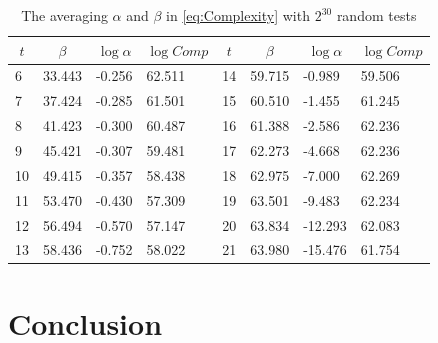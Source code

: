 \begin{table}[htbp]
  \centering
  \caption{The averaging $\alpha$ and $\beta$ in \eqref{eq:Complexity} with $2^{30}$ random tests}\label{tab:ZhangAlphaAndBetaOriginal}
    \begin{tabular}{|l|l|l|l|l|l|l|l|}
    \hline
    \multicolumn{1}{|c|}{$t$} & \multicolumn{1}{c|}{$\beta$} & \multicolumn{1}{c|}{$\log\alpha$} & \multicolumn{1}{c|}{$\log Comp$} & \multicolumn{1}{c|}{$t$} & \multicolumn{1}{c|}{$\beta$} & \multicolumn{1}{c|}{$\log\alpha$} & \multicolumn{1}{c|}{$\log Comp$} \\
    \hline

    6    & 33.443 & -0.256 & 62.511 & 14    & 59.715 & -0.989 &  59.506\\
    \hline
    7    & 37.424 & -0.285 & 61.501 & 15    & 60.510 & -1.455 &  61.245\\
    \hline
    8    & 41.423 & -0.300 & 60.487 & 16    & 61.388 & -2.586 &  62.236\\
    \hline
    9    & 45.421  & -0.307 & 59.481 & 17    & 62.273 & -4.668 &  62.236\\
    \hline
    10   & 49.415 & -0.357  & 58.438 & 18    & 62.975 & -7.000 &  62.269\\
    \hline
    11    & 53.470 & -0.430 & 57.309 & 19    & 63.501 & -9.483 &  62.234\\
    \hline
    12    & 56.494 & -0.570 & 57.147 & 20    & 63.834 & -12.293 &  62.083\\
    \hline
    13    & 58.436 & -0.752 & 58.022 & 21    & 63.980 & -15.476 &  61.754\\
    \hline
    \end{tabular}%
\end{table}%



\section{Conclusion}





\ifLNCSVER
  
\else
  
\fi





\ifLNCSVER

\else

\fi





